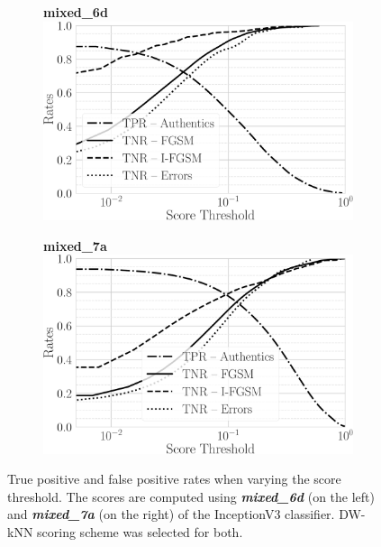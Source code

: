 \begin{figure}
\centering%
\begin{subfigure}[t]{0.5\linewidth}%
\centering
\textbf{mixed\_6d}\\
\includegraphics[width=\linewidth]{rates-mixed_6d-dwknn}%
\label{fig:adv:score-density-mixed_6e}%
\end{subfigure}%
%
\begin{subfigure}[t]{0.5\linewidth}%
\centering
\textbf{mixed\_7a}\\
\includegraphics[width=\linewidth]{rates-mixed_7a-dwknn}%
\label{fig:adv:score-density-mixed_7a}%
\end{subfigure}%
%
\caption{True positive and false positive rates when varying the score threshold. The scores are computed using \textbf{\emph{mixed\_6d}} (on the left) and \textbf{\emph{mixed\_7a}} (on the right) of the InceptionV3 classifier.
DW-kNN scoring scheme was selected for both.}
\label{fig:adv:i3-distr}
\end{figure}

